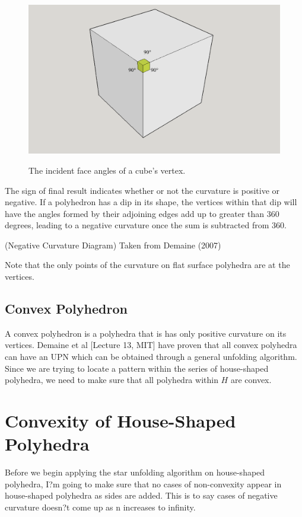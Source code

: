 \documentclass[12 pt]{article}
\begin{document}
\begin{figure}[h]
\caption{The incident face angles of a cube's vertex.}
\centering
\includegraphics[scale=0.35]{cubeCurvature.png}
\label{cubeAngles}
\end{figure}

	The sign of final result indicates whether or not the curvature is positive or negative. If a polyhedron has a dip in its shape, the vertices within that dip will have the angles formed by their adjoining edges add up to greater than 360 degrees, leading to a negative curvature once the sum is subtracted from 360. 
	
(Negative Curvature Diagram)
Taken from Demaine (2007)

	Note that the only points of the curvature on flat surface polyhedra are at the vertices.

\subsection*{Convex Polyhedron}
	A convex polyhedron is a polyhedra that is has only positive curvature on its vertices. Demaine et al [Lecture 13, MIT] have proven that all convex polyhedra can have an UPN which can be obtained through a general unfolding algorithm. Since we are trying to locate a pattern within the series of house-shaped polyhedra, we need to make sure that all polyhedra within $H$ are convex.

\section{Convexity of House-Shaped Polyhedra}
	Before we begin applying the star unfolding algorithm on house-shaped polyhedra, I?m going to make sure that no cases of non-convexity appear in house-shaped polyhedra as sides are added. This is to say cases of negative curvature doesn?t come up as n increases to infinity.
	
\end{document}
